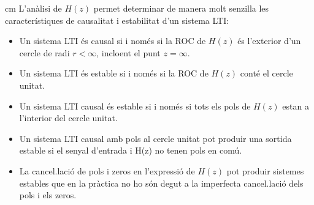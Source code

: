\documentclass{article}
\begin{document}
 cm
\noindent
L'an\`alisi de $H(z)$ permet determinar de manera molt senzilla les caracter\'istiques de
causalitat i estabilitat d'un sistema LTI:
\begin{itemize}
\item Un sistema LTI \'es causal si i nom\'es si la ROC de $H(z)$ \'es l'exterior d'un cercle de
radi $r < \infty$, incloent el punt $z=\infty$.
\item Un sistema LTI \'es estable si i nom\'es si la ROC de $H(z)$ cont\'e el cercle unitat.
\item Un sistema LTI causal \'es estable si i nom\'es si tots els pols de $H(z)$ estan a l'interior 
del cercle unitat. 
\item Un sistema LTI causal amb pols al cercle unitat pot produir una sortida estable 
si el senyal d'entrada i H(z) no tenen pols en com\'u. 
\item La cancel.laci\'o de pols i zeros en l'expressi\'o de $H(z)$ pot produir sistemes 
estables que en la pr\`actica no ho s\'on degut a la imperfecta cancel.laci\'o dels pols i els zeros.
\end{itemize}
 
\end{document}
